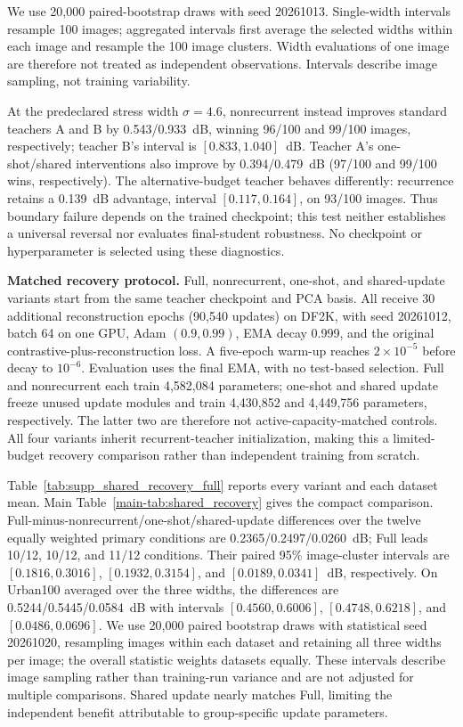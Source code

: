 \documentclass[10pt,journal,letterpaper]{IEEEtran}
\begin{document}




We use 20,000 paired-bootstrap draws with seed 20261013. Single-width intervals resample 100 images; aggregated intervals first average the selected widths within each image and resample the 100 image clusters. Width evaluations of one image are therefore not treated as independent observations. Intervals describe image sampling, not training variability.

At the predeclared stress width $\sigma=4.6$, nonrecurrent instead improves standard teachers A and B by 0.543/0.933~dB, winning 96/100 and 99/100 images, respectively; teacher B's interval is $[0.833,1.040]$~dB. Teacher A's one-shot/shared interventions also improve by 0.394/0.479~dB (97/100 and 99/100 wins, respectively). The alternative-budget teacher behaves differently: recurrence retains a 0.139~dB advantage, interval $[0.117,0.164]$, on 93/100 images. Thus boundary failure depends on the trained checkpoint; this test neither establishes a universal reversal nor evaluates final-student robustness. No checkpoint or hyperparameter is selected using these diagnostics.

\noindent\textbf{Matched recovery protocol.}
Full, nonrecurrent, one-shot, and shared-update variants start from the same teacher checkpoint and PCA basis. All receive 30 additional reconstruction epochs (90,540 updates) on DF2K, with seed 20261012, batch 64 on one GPU, Adam $(0.9,0.99)$, EMA decay 0.999, and the original contrastive-plus-reconstruction loss. A five-epoch warm-up reaches $2\times10^{-5}$ before decay to $10^{-6}$. Evaluation uses the final EMA, with no test-based selection. Full and nonrecurrent each train 4,582,084 parameters; one-shot and shared update freeze unused update modules and train 4,430,852 and 4,449,756 parameters, respectively. The latter two are therefore not active-capacity-matched controls. All four variants inherit recurrent-teacher initialization, making this a limited-budget recovery comparison rather than independent training from scratch.

Table~\ref{tab:supp_shared_recovery_full} reports every variant and each dataset mean. Main Table~\ref{main-tab:shared_recovery} gives the compact comparison. Full-minus-nonrecurrent/one-shot/shared-update differences over the twelve equally weighted primary conditions are 0.2365/0.2497/0.0260~dB; Full leads 10/12, 10/12, and 11/12 conditions. Their paired 95\% image-cluster intervals are $[0.1816,0.3016]$, $[0.1932,0.3154]$, and $[0.0189,0.0341]$~dB, respectively. On Urban100 averaged over the three widths, the differences are 0.5244/0.5445/0.0584~dB with intervals $[0.4560,0.6006]$, $[0.4748,0.6218]$, and $[0.0486,0.0696]$. We use 20,000 paired bootstrap draws with statistical seed 20261020, resampling images within each dataset and retaining all three widths per image; the overall statistic weights datasets equally. These intervals describe image sampling rather than training-run variance and are not adjusted for multiple comparisons. Shared update nearly matches Full, limiting the independent benefit attributable to group-specific update parameters.
\end{document}
